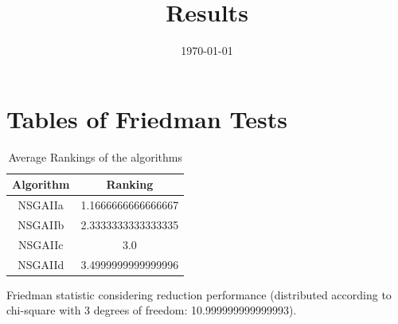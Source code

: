 \documentclass{article}
\title{Results}
\author{}
\date{\today}
\begin{document}
\oddsidemargin 0in \topmargin 0in\maketitle
\section{Tables of Friedman Tests}
\begin{table}[!htp]
\centering
\caption{Average Rankings of the algorithms
}\begin{tabular}{c|c}
Algorithm&Ranking\\
\hline
NSGAIIa&1.1666666666666667\\
NSGAIIb&2.3333333333333335\\
NSGAIIc&3.0\\
NSGAIId&3.4999999999999996\\
\end{tabular}
\end{table}


Friedman statistic considering reduction performance (distributed according to chi-square with 3 degrees of freedom: 10.999999999999993).
\end{document}

